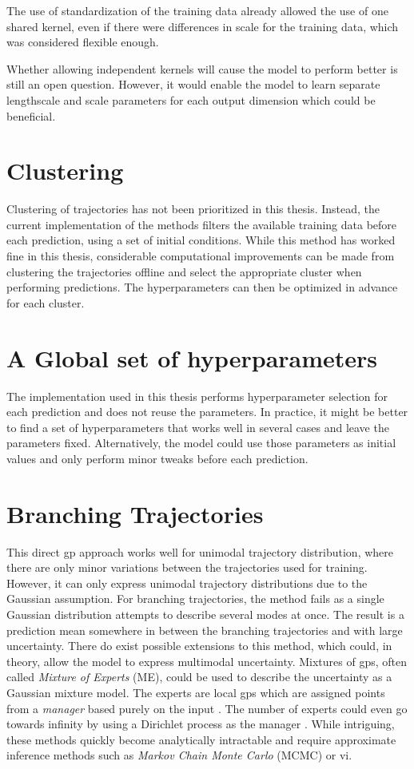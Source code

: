 The use of standardization of the training data already allowed the use of one shared kernel, even if there were differences in scale for the training data, which was considered flexible enough.

Whether allowing independent kernels will cause the model to perform better is still an open question. However, it would enable the model to learn separate lengthscale and scale parameters for each output dimension which could be beneficial. 

\section{Clustering}
Clustering of trajectories has not been prioritized in this thesis. Instead, the current implementation of the methods filters the available training data before each prediction, using a set of initial conditions. While this method has worked fine in this thesis, considerable computational improvements can be made from clustering the trajectories offline and select the appropriate cluster when performing predictions. The hyperparameters can then be optimized in advance for each cluster.

\section{A Global set of hyperparameters}
The implementation used in this thesis performs hyperparameter selection for each prediction and does not reuse the parameters. In practice, it might be better to find a set of hyperparameters that works well in several cases and leave the parameters fixed. Alternatively, the model could use those parameters as initial values and only perform minor tweaks before each prediction. 

\section{Branching Trajectories}
This direct \acrshort{gp} approach works well for unimodal trajectory distribution, where there are only minor variations between the trajectories used for training. However, it can only express unimodal trajectory distributions due to the Gaussian assumption. For branching trajectories, the method fails as a single Gaussian distribution attempts to describe several modes at once. The result is a prediction mean somewhere in between the branching trajectories and with large uncertainty. There do exist possible extensions to this method, which could, in theory, allow the model to express multimodal uncertainty. Mixtures of \acrshort{gp}s, often called \textit{Mixture of Experts} (ME), could be used to describe the uncertainty as a Gaussian mixture model. The experts are local \acrshort{gp}s which are assigned points from a \textit{manager} based purely on the input \cite{rasmussen}. The number of experts could even go towards infinity by using a Dirichlet process as the manager \cite{dirichlet_process_gp}. While intriguing, these methods quickly become analytically intractable and require approximate inference methods such as \textit{Markov Chain Monte Carlo} (MCMC) or \acrshort{vi}. 

